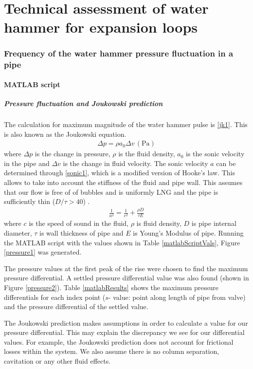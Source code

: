 \part{Technical assessment of water hammer for expansion loops}
\section{Frequency of the water hammer pressure fluctuation in a pipe}
\subsection{MATLAB script}
\subsubsection{Pressure fluctuation and Joukowski prediction}
The calculation for maximum magnitude of the water hammer pulse is \eqref{jk1}. This is also known as the Joukowski equation.
\begin{gather}\label{jk1}
    \Delta p = \rho a_0 \Delta v\, (\si{\pascal})
\end{gather}
where $\Delta p$ is the change in pressure, $\rho$ is the fluid density, $a_0$ is the sonic velocity in the pipe and $\Delta v$ is the change in fluid velocity. The sonic velocity $a$ can be determined through \eqref{sonic1}, which is a modified version of Hooke's law. This allows to take into account the stiffness of the fluid and pipe wall. This assumes that our flow is free of of bubbles and is uniformly LNG and the pipe is sufficiently thin ($D/\tau > 40$) \cite{Watters1984AnalysisAC}.
\begin{gather}\label{sonic1}
    \frac{1}{a^2} = \frac{1}{c^2} + \frac{\rho D }{\tau E}
\end{gather}
where $c$ is the speed of sound in the fluid, $\rho$ is fluid density, $D$ is pipe internal diameter, $\tau$ is wall thickness of pipe and $E$ is Young's Modulus of pipe. Running the MATLAB script with the values shown in Table \ref{matlabScriptVals}, Figure \ref{pressure1} was generated.

The pressure values at the first peak of the rise were chosen to find the maximum pressure differential. A settled pressure differential value was also found (shown in Figure \ref{pressure2}). Table \ref{matlabResults} shows the maximum pressure differentials for each index point ($s$- value: point along length of pipe from valve) and the pressure differential of the settled value.

The Joukowski prediction makes assumptions in order to calculate a value for our pressure differential. This may explain the discrepancy we see for our differential values. For example, the Joukowski prediction does not account for frictional losses within the system. We also assume there is no column separation, cavitation or any other fluid effects.

